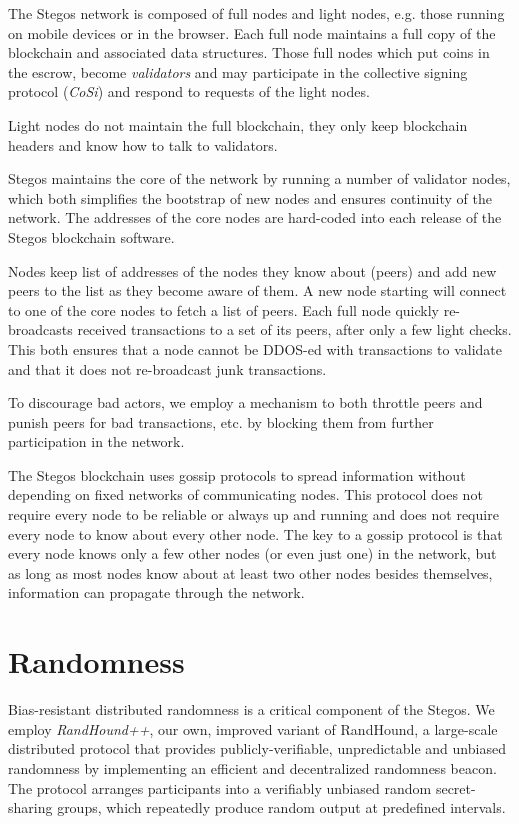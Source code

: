 \documentclass[a4paper, 10pt, conference]{ieeeconf}
\begin{document}
The Stegos network is composed of full nodes and light nodes, e.g. those running on mobile devices or in the browser. Each full node maintains a full copy of the blockchain and associated data structures. Those full nodes which put coins in the escrow, become \textit{validators} and may participate in the collective signing protocol (\textit{CoSi}) and respond to requests of the light nodes. 

Light nodes do not maintain the full blockchain, they only keep blockchain headers and know how to talk to validators. 

Stegos maintains the core of the network by running a number of validator nodes, which both simplifies the bootstrap of new nodes and ensures continuity of the network. The addresses of the core nodes are hard-coded into each release of the Stegos blockchain software.

Nodes keep list of addresses of the nodes they know about (peers) and add new peers to the list as they become aware of them. A new node starting will connect to one of the core nodes to fetch a list of peers. Each full node quickly re-broadcasts received transactions to a set of its peers, after only a few light checks. This both ensures that a node cannot be DDOS-ed with transactions to validate and that it does not re-broadcast junk transactions.

To discourage bad actors, we employ a mechanism to both throttle peers and punish peers for bad transactions, etc. by blocking them from further participation in the network.

The Stegos blockchain uses gossip protocols to spread information without depending on fixed networks of communicating nodes. This protocol does not require every node to be reliable or always up and running and does not require every node to know about every other node. The key to a gossip protocol is that every node knows only a few other nodes (or even just one) in the network, but as long as most nodes know about at least two other nodes besides themselves, information can propagate through the network.

\section{Randomness}\label{randomness}

Bias-resistant distributed randomness is a critical component of the Stegos. We employ \textit{RandHound++}, our own, improved variant of RandHound\cite{c12}, a large-scale distributed protocol that provides publicly-verifiable, unpredictable and unbiased randomness by implementing an efficient and decentralized randomness beacon. The protocol arranges participants into a verifiably unbiased random secret-sharing groups, which repeatedly produce random output at predefined intervals. 
\end{document}
